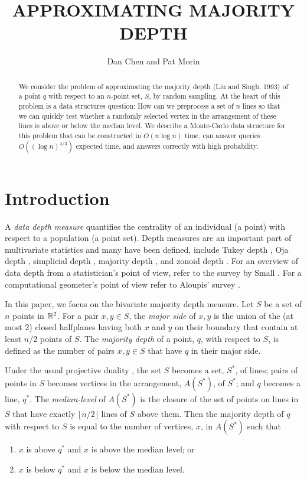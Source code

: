\documentclass{patmorin}
\title{\MakeUppercase{Approximating Majority Depth}}
\author{Dan Chen and Pat Morin}
\begin{document}
\maketitle

\begin{abstract}
We consider the problem of approximating the majority depth (Liu and
Singh, 1993) of a point $q$ with respect to an $n$-point set, $S$,
by random sampling.  At the heart of this problem is a data structures
question: How can we preprocess a set of $n$ lines so that we can quickly
test whether a randomly selected vertex in the arrangement of these
lines is above or below the median level.  We describe a Monte-Carlo data
structure for this problem that can be constructed in $O(n\log n)$ time,
can answer queries $O((\log n)^{4/3})$ expected time, and answers correctly
with high probability.
\end{abstract}

\section{Introduction}

A \emph{data depth measure} quantifies the centrality
of an individual (a point) with respect to a population (a point set).
Depth measures are an important part of multivariate statistics and many
have been defined, include Tukey depth \cite{t74}, Oja
depth \cite{o83}, simplicial depth \cite{l90}, majority depth \cite{ls93},
and zonoid depth \cite{dkm96}.  For an overview of data depth from a
statistician's point of view, refer to the survey by Small \cite{s90}.
For a computational geometer's point of view refer to Aloupis' survey
\cite{a06}.

In this paper, we focus on the bivariate majority depth measure.
Let $S$ be a set of $n$ points in $\mathbb{R}^2$.  For a pair $x,y\in S$,
the \emph{major side} of $x,y$ is the union of the (at most 2) closed
halfplanes having both $x$ and $y$ on their boundary that contain at
least $n/2$ points of $S$.  The \emph{majority depth} \cite{ls93,s91}
of a point, $q$, with respect to $S$, is defined as the number of pairs
$x,y\in S$ that have $q$ in their major side.

Under the usual projective duality \cite{e97}, the set $S$ becomes
a set, $S^*$, of lines; pairs of points in $S$ becomes vertices
in the arrangement, $A(S^*)$, of $S^*$; and $q$ becomes a line, $q^*$.
The \emph{median-level} of $A(S^*)$ is the closure of the set of points
on lines in $S$ that have exactly $\lfloor n/2\rfloor$ lines of $S$
above them.  Then the majority depth of $q$ with respect to $S$ is equal
to the number of vertices, $x$, in $A(S^*)$ such that
\begin{enumerate}
\item $x$ is above $q^*$ and $x$ is above the median level; or
\item $x$ is below $q^*$ and $x$ is below the median level.
\end{enumerate}
\end{document}
